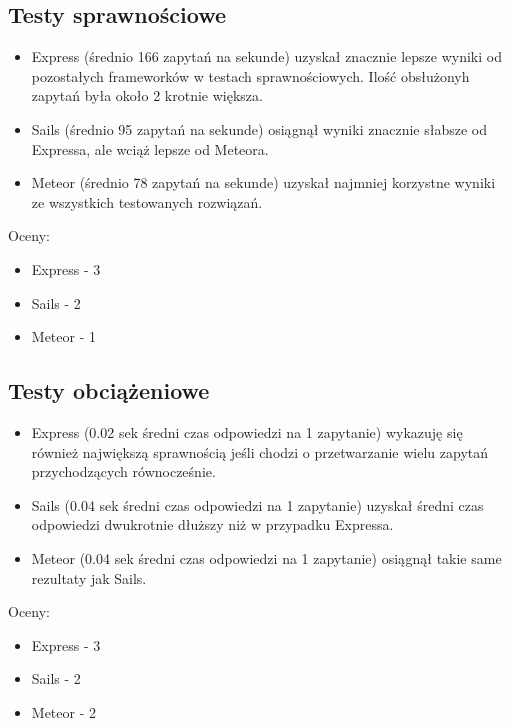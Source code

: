 \documentclass[12pt]{report}
\begin{document}
    \subsection{Testy sprawnościowe}
      \begin{itemize}
        \item Express (średnio 166 zapytań na sekunde) uzyskał znacznie lepsze wyniki od pozostałych frameworków w testach sprawnościowych. Ilość obsłużonyh zapytań była około 2 krotnie większa.
        \item Sails (średnio 95 zapytań na sekunde) osiągnął wyniki znacznie słabsze od Expressa, ale wciąż lepsze od Meteora.
        \item Meteor (średnio 78 zapytań na sekunde) uzyskał najmniej korzystne wyniki ze wszystkich testowanych rozwiązań.
      \end{itemize}
      Oceny:
      \begin{itemize}
        \item Express - 3
        \item Sails - 2
        \item Meteor - 1
      \end{itemize}
      
    \subsection{Testy obciążeniowe}
      \begin{itemize}
        \item Express (0.02 sek średni czas odpowiedzi na 1 zapytanie) wykazuję się również największą sprawnością jeśli chodzi o przetwarzanie wielu zapytań przychodzących równocześnie.
        \item Sails (0.04 sek średni czas odpowiedzi na 1 zapytanie) uzyskał średni czas odpowiedzi dwukrotnie dłuższy niż w przypadku Expressa.
        \item Meteor (0.04 sek średni czas odpowiedzi na 1 zapytanie) osiągnął takie same rezultaty jak Sails.
      \end{itemize}
      Oceny:
      \begin{itemize}
        \item Express - 3
        \item Sails - 2
        \item Meteor - 2
      \end{itemize}
      
\end{document}
